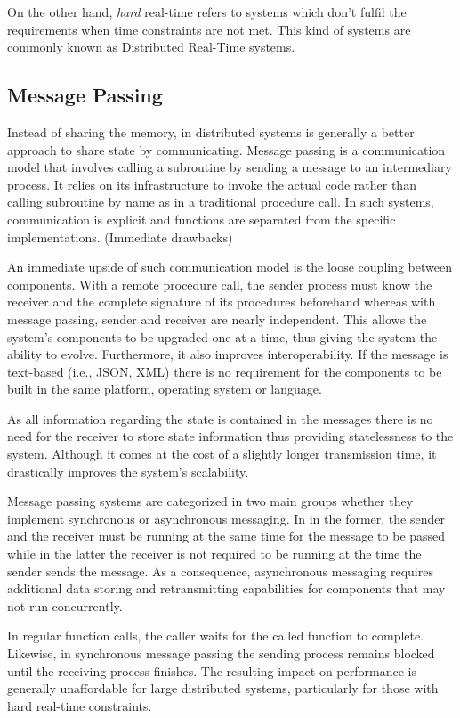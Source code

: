 On the other hand, \textit{hard} real-time refers to systems which don't fulfil the requirements when time constraints are not met. This kind of systems are commonly known as Distributed Real-Time systems.

\subsection{Message Passing} \label{message_passing}

Instead of sharing the memory, in distributed systems is generally a better approach to share state by communicating. Message passing is a communication model that involves calling a subroutine by sending a message to an intermediary process. It relies on its infrastructure to invoke the actual code rather than calling subroutine by name as in a traditional procedure call. In such systems, communication is explicit and functions are separated from the specific implementations. (Immediate drawbacks)

An immediate upside of such communication model is the loose coupling between components. With a remote procedure call, the sender process must know the receiver and the complete signature of its procedures beforehand whereas with message passing, sender and receiver are nearly independent. This allows the system's components to be upgraded one at a time, thus giving the system the ability to evolve. Furthermore, it also improves interoperability. If the message is text-based (i.e., JSON, XML) there is no requirement for the components to be built in the same platform, operating system or language.

As all information regarding the state is contained in the messages there is no need for the receiver to store state information thus providing statelessness to the system. Although it comes at the cost of a slightly longer transmission time, it drastically improves the system's scalability.

Message passing systems are categorized in two main groups whether they implement synchronous or asynchronous messaging. In in the former, the sender and the receiver must be running at the same time for the message to be passed while in the latter the receiver is not required to be running at the time the sender sends the message. As a consequence, asynchronous messaging requires additional data storing and retransmitting capabilities for components that may not run concurrently.

In regular function calls, the caller waits for the called function to complete. Likewise, in synchronous message passing the sending process remains blocked until the receiving process finishes. The resulting impact on performance is generally unaffordable for large distributed systems, particularly for those with hard real-time constraints.

